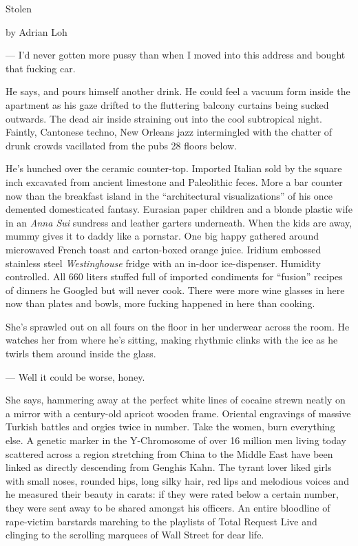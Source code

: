 \documentclass[11pt]{article}
\newcommand{\ga}[1]{\fontspec[Ligatures={Common}]{Adobe Garamond Pro}\fontsize{48pt}{50pt}\selectfont #1}
\begin{document}
\begin{center}\ga{Stolen}\end{center}
\begin{center}by Adrian Loh\end{center}

	--- I'd never gotten more pussy than when I moved into this address and 
bought that fucking car. 

	He says, and pours himself another drink. He could feel 
a vacuum form inside the apartment as his gaze drifted to the fluttering 
balcony curtains being sucked outwards. The dead air inside straining out into 
the cool subtropical night. Faintly, Cantonese techno, New Orleans jazz 
intermingled with the chatter of drunk crowds vacillated from the pubs 28 
floors below.

	He's hunched over the ceramic counter-top. Imported Italian sold by the square
inch excavated from ancient limestone and Paleolithic feces. More a bar counter
now than the breakfast island in the ``architectural visualizations'' of his once
demented domesticated fantasy. Eurasian paper children and a blonde plastic wife
in an \emph{Anna Sui} sundress and leather garters underneath. When the kids are
away, mummy gives it to daddy like a pornstar. One big happy gathered around
microwaved French toast and carton-boxed orange juice. Iridium embossed
stainless steel \emph{Westinghouse} fridge with an in-door ice-dispenser.
Humidity controlled. All 660 liters stuffed full of imported condiments for
``fusion'' recipes of dinners he Googled but will never cook. There were more wine
glasses in here now than plates and bowls, more fucking happened in here than
cooking.

	She's sprawled out on all fours on the floor in her underwear across the
room. He watches her from where he's sitting, making rhythmic clinks with the 
ice as he twirls them around inside the glass.

	--- Well it could be worse, honey.

	She says, hammering away at the perfect white lines of cocaine strewn 
neatly on a mirror with a century-old apricot wooden frame. Oriental engravings 
of massive Turkish battles and orgies twice in number. Take the women, burn 
everything else. A genetic marker in the Y-Chromosome of over 16 million men 
living today scattered across a region stretching from China to the Middle East 
have been linked as directly descending from Genghis Kahn. The tyrant lover 
liked girls with small noses, rounded hips, long silky hair, red lips and 
melodious voices and he measured their beauty in carats: if they were rated 
below a certain number, they were sent away to be shared amongst his officers. 
An entire bloodline of rape-victim barstards marching to the playlists of Total 
Request Live and clinging to the scrolling marquees of Wall Street for dear 
life.
\end{document}
